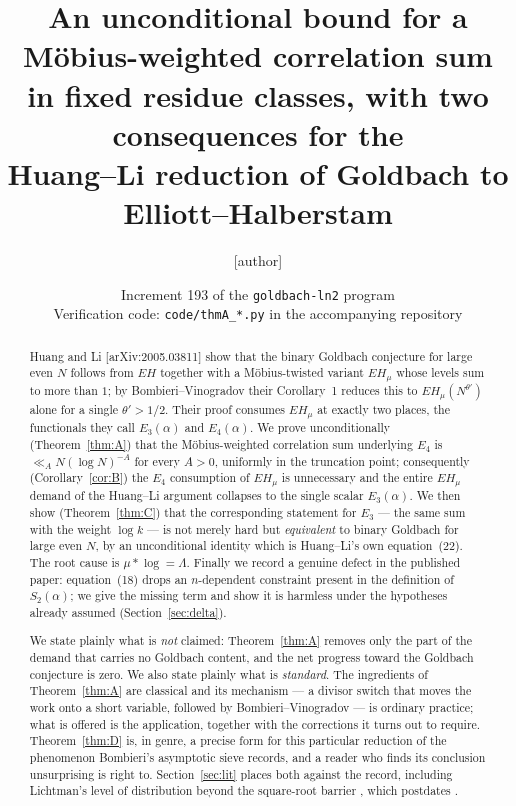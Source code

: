 \documentclass[11pt,a4paper]{article}
\title{An unconditional bound for a M\"obius-weighted correlation sum\\
in fixed residue classes, with two consequences for the\\
Huang--Li reduction of Goldbach to Elliott--Halberstam}
\author{[author]}
\date{Increment 193 of the \texttt{goldbach-ln2} program\\
\small Verification code: \texttt{code/thmA\_*.py} in the accompanying repository}
\theoremstyle{plain}
\theoremstyle{definition}
\begin{document}
\maketitle

\begin{abstract}
Huang and Li [arXiv:2005.03811] show that the binary Goldbach conjecture
for large even $N$ follows from $EH$ together with a M\"obius-twisted
variant $EH_\mu$ whose levels sum to more than $1$; by Bombieri--Vinogradov
their Corollary~1 reduces this to $EH_\mu(N^{\theta'})$ alone for a single
$\theta' > 1/2$. Their proof consumes $EH_\mu$ at exactly two places, the
functionals they call $E_3(\alpha)$ and $E_4(\alpha)$. We prove
unconditionally (Theorem~\ref{thm:A}) that the M\"obius-weighted
correlation sum underlying $E_4$ is
$\ll_A N(\log N)^{-A}$ for every $A>0$, uniformly in the truncation
point; consequently (Corollary~\ref{cor:B}) the $E_4$ consumption of
$EH_\mu$ is unnecessary and the entire $EH_\mu$ demand of the Huang--Li
argument collapses to the single scalar $E_3(\alpha)$. We then show
(Theorem~\ref{thm:C}) that the corresponding statement for $E_3$ --- the
same sum with the weight $\log k$ --- is not merely hard but
\emph{equivalent} to binary Goldbach for large even $N$, by an
unconditional identity which is Huang--Li's own equation~(22). The root
cause is $\mu * \log = \Lambda$. Finally we record a genuine defect in
the published paper: equation~(18) drops an $n$-dependent constraint
present in the definition of $S_2(\alpha)$; we give the missing term and
show it is harmless under the hypotheses already assumed
(Section~\ref{sec:delta}).

We state plainly what is \emph{not} claimed: Theorem~\ref{thm:A} removes
only the part of the demand that carries no Goldbach content, and the
net progress toward the Goldbach conjecture is zero. We also state
plainly what is \emph{standard}. The ingredients of Theorem~\ref{thm:A}
are classical and its mechanism --- a divisor switch that moves the work
onto a short variable, followed by Bombieri--Vinogradov --- is ordinary
practice; what is offered is the application, together with the
corrections it turns out to require. Theorem~\ref{thm:D} is, in genre, a
precise form for this particular reduction of the phenomenon Bombieri's
asymptotic sieve records, and a reader who finds its conclusion
unsurprising is right to. Section~\ref{sec:lit} places both against the
record, including Lichtman's level of distribution beyond the
square-root barrier \cite{Li23}, which postdates \cite{HL}.
\end{abstract}
\end{document}
